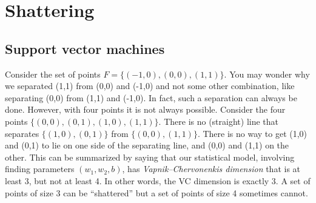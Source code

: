 

\section{Shattering}
\subsection{Support vector machines}
	Consider the set of points $F=\{(-1,0),(0,0),(1,1)\}$.
	You may wonder why we separated (1,1) from (0,0) and (-1,0) and not some other combination, like separating (0,0) from (1,1) and (-1,0).
	In fact, such a separation can always be done. However, with four points it is not always possible.
	Consider the four points $\{(0,0),(0,1),(1,0),(1,1)\}$. There is no (straight) line that separates $\{(1,0),(0,1)\}$ from $\{(0,0),(1,1)\}$.
	There is no way to get (1,0) and (0,1) to lie on one side of the separating line, and (0,0) and (1,1) on the other.
	This can be summarized by saying that our statistical model,
	involving finding parameters $(w_1,w_2,b)$,
	has \emph{Vapnik--Chervonenkis dimension} that is at least 3, but not at least 4.
	In other words, the VC dimension is exactly 3. A set of points of size 3 can be ``shattered'' but a set of points of size 4 sometimes cannot.

